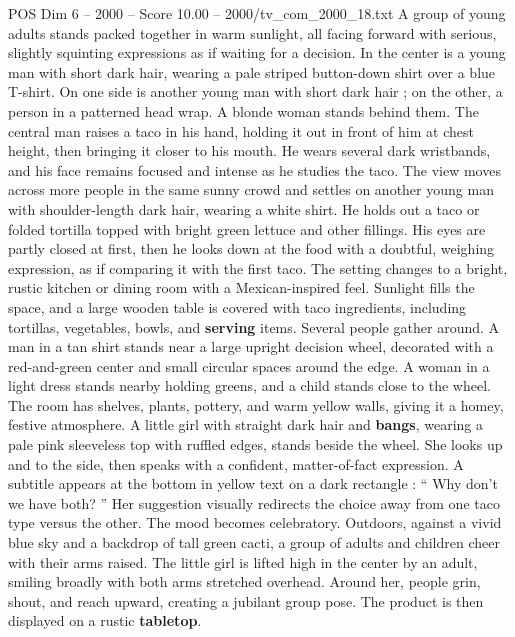 \begin{textsample}{POS Dim 6 – 2000 – Score 10.00 – 2000/tv\_com\_2000\_18.txt}  \label{ex:f6_pos_051}
A group of young adults stands packed together in warm sunlight, all facing forward with serious, slightly squinting expressions as if waiting for a decision.
In the center is a young man with short dark hair, wearing a pale striped button-down shirt over a blue T-shirt.
On one side is another young man with short dark hair ; on the other, a person in a patterned head wrap.
A blonde woman stands behind them.
The central man raises a taco in his hand, holding it out in front of him at chest height, then bringing it closer to his mouth.
He wears several dark wristbands, and his face remains focused and intense as he studies the taco.
The view moves across more people in the same sunny crowd and settles on another young man with shoulder-length dark hair, wearing a white shirt.
He holds out a taco or folded tortilla topped with bright green lettuce and other fillings.
His eyes are partly closed at first, then he looks down at the food with a doubtful, weighing expression, as if comparing it with the first taco.
The setting changes to a bright, rustic kitchen or dining room with a Mexican-inspired feel.
Sunlight fills the space, and a large wooden table is covered with taco ingredients, including tortillas, vegetables, bowls, and \textbf{serving} items.
Several people gather around.
A man in a tan shirt stands near a large upright decision wheel, decorated with a red-and-green center and small circular spaces around the edge.
A woman in a light dress stands nearby holding greens, and a child stands close to the wheel.
The room has shelves, plants, pottery, and warm yellow walls, giving it a homey, festive atmosphere.
A little girl with straight dark hair and \textbf{bangs}, wearing a pale pink sleeveless top with ruffled edges, stands beside the wheel.
She looks up and to the side, then speaks with a confident, matter-of-fact expression.
A subtitle appears at the bottom in yellow text on a dark rectangle : “ Why don't we have both? ” Her suggestion visually redirects the choice away from one taco type versus the other.
The mood becomes celebratory.
Outdoors, against a vivid blue sky and a backdrop of tall green cacti, a group of adults and children cheer with their arms raised.
The little girl is lifted high in the center by an adult, smiling broadly with both arms stretched overhead.
Around her, people grin, shout, and reach upward, creating a jubilant group pose.
The product is then displayed on a rustic \textbf{tabletop}.

\end{textsample}
